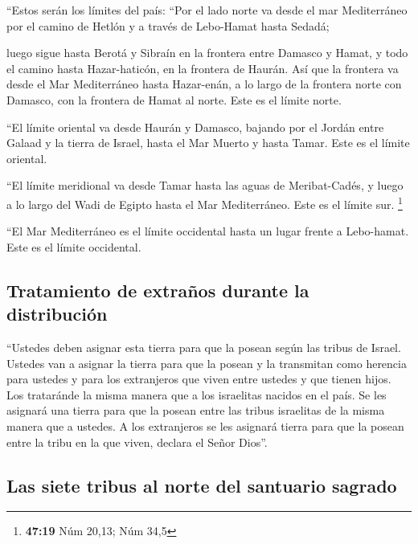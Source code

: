  ``Estos serán los límites del país: ``Por el lado norte
va desde el mar Mediterráneo por el camino de Hetlón y a través de
Lebo-Hamat hasta Sedadá;

 luego sigue hasta Berotá y Sibraín en la frontera entre
Damasco y Hamat, y todo el camino hasta Hazar-haticón, en la frontera de
Haurán.  Así que la frontera va desde el Mar Mediterráneo
hasta Hazar-enán, a lo largo de la frontera norte con Damasco, con la
frontera de Hamat al norte. Este es el límite norte.

 ``El límite oriental va desde Haurán y Damasco, bajando
por el Jordán entre Galaad y la tierra de Israel, hasta el Mar Muerto y
hasta Tamar. Este es el límite oriental.

 ``El límite meridional va desde Tamar hasta las aguas de
Meribat-Cadés, y luego a lo largo del Wadi de Egipto hasta el Mar
Mediterráneo. Este es el límite sur. \footnote{\textbf{47:19} Núm 20,13;
  Núm 34,5}

 ``El Mar Mediterráneo es el límite occidental hasta un
lugar frente a Lebo-hamat. Este es el límite occidental.

\hypertarget{tratamiento-de-extrauxf1os-durante-la-distribuciuxf3n}{%
\subsection{Tratamiento de extraños durante la
distribución}\label{tratamiento-de-extrauxf1os-durante-la-distribuciuxf3n}}

 ``Ustedes deben asignar esta tierra para que la posean
según las tribus de Israel.  Ustedes van a asignar la
tierra para que la posean y la transmitan como herencia para ustedes y
para los extranjeros que viven entre ustedes y que tienen hijos. Los
trataránde la misma manera que a los israelitas nacidos en el país. Se
les asignará una tierra para que la posean entre las tribus israelitas
de la misma manera que a ustedes.  A los extranjeros se
les asignará tierra para que la posean entre la tribu en la que viven,
declara el Señor Dios''.

\hypertarget{las-siete-tribus-al-norte-del-santuario-sagrado}{%
\subsection{Las siete tribus al norte del santuario
sagrado}\label{las-siete-tribus-al-norte-del-santuario-sagrado}}

